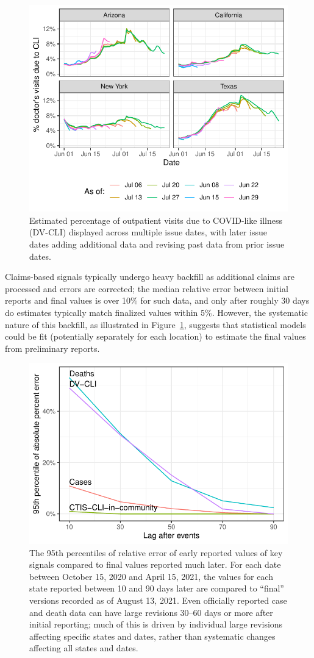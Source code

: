 \documentclass[11pt]{article}
\begin{document}
\begin{figure}[t]
  \centering
  \includegraphics[width=0.8\columnwidth]{fig/dv_as_of.pdf}
  \caption{Estimated percentage of outpatient visits due to COVID-like illness
    (DV-CLI) displayed across multiple issue dates, with later issue dates
    adding additional data and revising past data from prior issue dates.}
  \label{fig:dv_as_of}
\end{figure}

Claims-based signals typically undergo heavy backfill as additional claims are
processed and errors are corrected; the median relative error between initial
reports and final values is over 10\% for such data, and only after roughly 30
days do estimates typically match finalized values within 5\%. However, the
systematic nature of this backfill, as illustrated in Figure~\ref{fig:dv_as_of},
suggests that statistical models could be fit (potentially separately for each
location) to estimate the final values from preliminary reports.

\begin{figure}[t]
  \centering
  \includegraphics[width=0.6\columnwidth]{fig/backfill-compare.pdf}
  \caption{The 95th percentiles of relative error of early reported values of
    key signals compared to final values reported much later. For each date
    between October 15, 2020 and April 15, 2021, the values for each state
    reported between 10 and 90 days later are compared to ``final'' versions
    recorded as of August 13, 2021. Even officially reported case and death data
    can have large revisions 30--60 days or more after initial reporting; much
    of this is driven by individual large revisions affecting specific states
    and dates, rather than systematic changes affecting all states and dates.}
  \label{fig:backfill-compare}
\end{figure}
\end{document}
